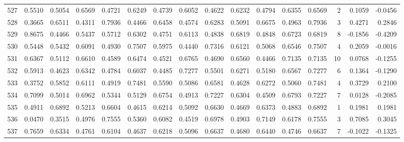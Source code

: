 \begin{tabular}{lrrrrrrrrrrrrrrr}
527 &      0.5510 &  0.5054 &  0.6569 &  0.4721 &  0.6249 &  0.4739 &  0.6052 &  0.4622 &  0.6232 &  0.4794 &   0.6355 &     0.6569 &      2 &                    0.1059 &                    -0.0456 \\
528 &      0.3665 &  0.6511 &  0.4311 &  0.7936 &  0.4466 &  0.6458 &  0.4574 &  0.6283 &  0.5091 &  0.6675 &   0.4963 &     0.7936 &      3 &                    0.4271 &                     0.2846 \\
529 &      0.8675 &  0.4466 &  0.5437 &  0.5712 &  0.6302 &  0.4751 &  0.6113 &  0.4838 &  0.6819 &  0.4848 &   0.6723 &     0.6819 &      8 &                   -0.1856 &                    -0.4209 \\
530 &      0.5448 &  0.5432 &  0.6091 &  0.4930 &  0.7507 &  0.5975 &  0.4440 &  0.7316 &  0.6121 &  0.5068 &   0.6546 &     0.7507 &      4 &                    0.2059 &                    -0.0016 \\
531 &      0.6367 &  0.5112 &  0.6610 &  0.4589 &  0.6474 &  0.4521 &  0.6765 &  0.4690 &  0.6560 &  0.4466 &   0.7135 &     0.7135 &     10 &                    0.0768 &                    -0.1255 \\
532 &      0.5913 &  0.4623 &  0.6342 &  0.4784 &  0.6037 &  0.4485 &  0.7277 &  0.5501 &  0.6271 &  0.5180 &   0.6567 &     0.7277 &      6 &                    0.1364 &                    -0.1290 \\
533 &      0.3752 &  0.5852 &  0.6111 &  0.4919 &  0.7481 &  0.5590 &  0.5086 &  0.6581 &  0.4628 &  0.6272 &   0.5060 &     0.7481 &      4 &                    0.3729 &                     0.2100 \\
534 &      0.7099 &  0.5014 &  0.6962 &  0.5344 &  0.5129 &  0.6754 &  0.4913 &  0.7227 &  0.6304 &  0.4509 &   0.6793 &     0.7227 &      7 &                    0.0128 &                    -0.2085 \\
535 &      0.4911 &  0.6892 &  0.5213 &  0.6604 &  0.4615 &  0.6214 &  0.5092 &  0.6630 &  0.4669 &  0.6373 &   0.4883 &     0.6892 &      1 &                    0.1981 &                     0.1981 \\
536 &      0.0470 &  0.3515 &  0.4976 &  0.7555 &  0.5360 &  0.6082 &  0.4519 &  0.6978 &  0.4903 &  0.7149 &   0.6178 &     0.7555 &      3 &                    0.7085 &                     0.3045 \\
537 &      0.7659 &  0.6334 &  0.4761 &  0.6104 &  0.4637 &  0.6218 &  0.5096 &  0.6637 &  0.4680 &  0.6440 &   0.4746 &     0.6637 &      7 &                   -0.1022 &                    -0.1325 \\

\end{tabular}
